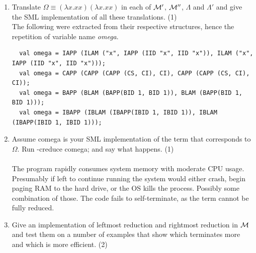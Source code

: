 \documentclass[11pt]{article}
\newenvironment{neverbreak} %
{\par\nobreak\vfil\penalty0\vfilneg
	\vtop\bgroup}
{\par\xdef\tpd{\the\prevdepth}\egroup
	\prevdepth=\tpd}
\begin{document}
\begin{enumerate}
\begin{neverbreak}
\begin{verbatim}
      > val eta2 = LAM ("z", APP (eta1, ID "z"));
      val eta2 =
         LAM ("z", APP (LAM ("x", APP (LAM ("x", ID "x"), ID "x")), ID "z")) : LEXP
      > printEtaReduction (etaReduce eta2);
      (!$\lambda$!z.((!$\lambda$!x.((!$\lambda$!x.x) x)) z)) -->!$\eta$!
      (!$\lambda$!x.((!$\lambda$!x.x) x)) -->!$\eta$!
      (!$\lambda$!x.x)
      val it = () : unit
      
       > val eta3 = APP (eta2, eta1);
       val eta3 =
          APP
             (LAM ("z", APP (LAM ("x", APP (LAM ("x", ID "x"), ID "x")), ID "z")),
                LAM ("x", APP (LAM ("x", ID "x"), ID "x"))) : LEXP
       > printEtaReduction (etaReduce eta3);
       ((!$\lambda$!z.((!$\lambda$!x.((!$\lambda$!x.x) x)) z)) (!$\lambda$!x.((!$\lambda$!x.x) x))) -->!$\eta$!
       ((!$\lambda$!x.((!$\lambda$!x.x) x)) (!$\lambda$!x.((!$\lambda$!x.x) x))) -->!$\eta$!
       ((!$\lambda$!x.x) (!$\lambda$!x.((!$\lambda$!x.x) x))) -->!$\eta$!
       ((!$\lambda$!x.x) (!$\lambda$!x.x))
       val it = () : unit
	\end{verbatim}
\end{neverbreak}
\pagebreak
\item
Translate $\Omega \equiv (\lambda x.xx)(\lambda x.xx)$ in each of ${\cal M}'$, ${\cal M}''$, $\Lambda$ and $\Lambda'$ and give the SML implementation of all these translations.  
  \hfill{(1)}\\ %
  
  The following were extracted from their respective structures, hence the repetition of variable name \textit{omega}.
  \begin{verbatim}
  val omega = IAPP (ILAM ("x", IAPP (IID "x", IID "x")), ILAM ("x", IAPP (IID "x", IID "x")));
  val omega = CAPP (CAPP (CAPP (CS, CI), CI), CAPP (CAPP (CS, CI), CI));
  val omega = BAPP (BLAM (BAPP(BID 1, BID 1)), BLAM (BAPP(BID 1, BID 1)));
  val omega = IBAPP (IBLAM (IBAPP(IBID 1, IBID 1)), IBLAM (IBAPP(IBID 1, IBID 1)));
  \end{verbatim}
  
\item
Assume comega is your SML implementation of the term that corresponds to $\Omega$.  Run -creduce comega; and say what happens.  
  \hfill{(1)} %
  \\ \\
  The program rapidly consumes system memory with moderate CPU usage. Presumably if left to continue running the system would either crash, begin paging RAM to the hard drive, or the OS kills the process. Possibly some combination of those. The code fails to self-terminate, as the term cannot be fully reduced.
\item
Give an implementation of leftmost reduction and rightmost reduction in ${\cal M}$ and test them on a number of examples that show which terminates more and which is more efficient. 
   \hfill{(2)} %


\end{enumerate}
\end{document}

